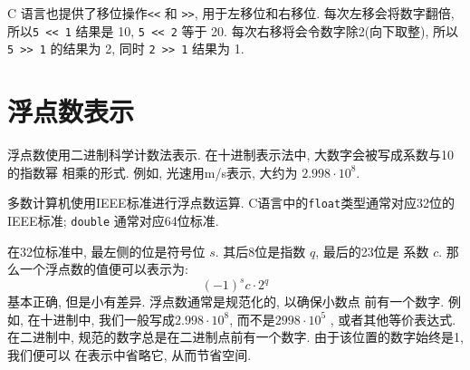\documentclass[12pt]{book}
\begin{document}
{%

C 语言也提供了移位操作{\tt <<} 和 {\tt >>}, 用于左移位和右移位.
每次左移会将数字翻倍, 所以{\tt 5 << 1} 结果是 10, {\tt 5 << 2} 等于 20.
每次右移将会令数字除2(向下取整), 所以{\tt 5 >> 1} 的结果为 2, 同时
{\tt 2 >> 1} 结果为 1.


\section{浮点数表示}

浮点数使用二进制科学计数法表示. 在十进制表示法中, 大数字会被写成系数与10的指数幂
相乘的形式. 例如, 光速用m/s表示, 大约为 $2.998 \cdot 10^8$.

多数计算机使用IEEE标准进行浮点数运算. C语言中的{\tt float}类型通常对应32位的
IEEE标准; {\tt double} 通常对应64位标准.

在32位标准中, 最左侧的位是符号位 $s$. 其后8位是指数 $q$, 最后的23位是
系数 $c$. 那么一个浮点数的值便可以表示为:
%
\[ (-1)^s c \cdot 2^q \]
%
基本正确, 但是小有差异. 浮点数通常是规范化的, 以确保小数点
前有一个数字. 例如, 在十进制中, 我们一般写成$2.998 \cdot 10^8$, 
而不是$2998 \cdot 10^5$ , 或者其他等价表达式. 在二进制中, 规范的数字总是在二进制点前有一个数字. 由于该位置的数字始终是1, 我们便可以
在表示中省略它, 从而节省空间.

}
\end{document}
